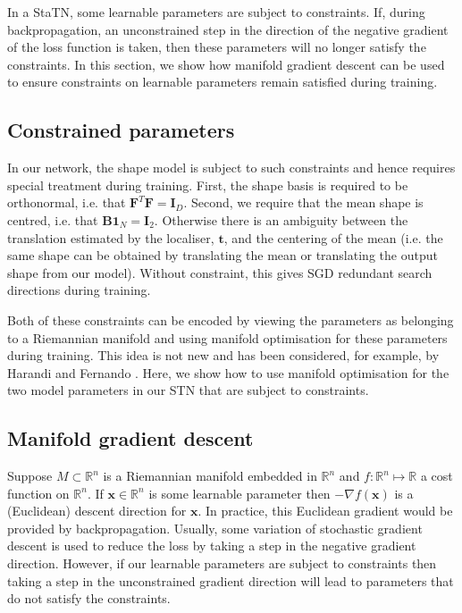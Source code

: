 \documentclass[runningheads]{llncs}
\newcommand{\R}{\mathbb{R}}
\begin{document}
In a StaTN, some learnable parameters are subject to constraints. If, during backpropagation, an unconstrained step in the direction of the negative gradient of the loss function is taken, then these parameters will no longer satisfy the constraints. In this section, we show how manifold gradient descent can be used to ensure constraints on learnable parameters remain satisfied during training. 

\subsection{Constrained parameters}

In our network, the shape model is subject to such constraints and hence requires special treatment during training. First, the shape basis is required to be orthonormal, i.e. that $\mathbf{F}^T\mathbf{F}=\mathbf{I}_D$. Second, we require that the mean shape is centred, i.e. that $\mathbf{B1}_N=\mathbf{I}_2$. Otherwise there is an ambiguity between the translation estimated by the localiser, $\mathbf{t}$, and the centering of the mean (i.e. the same shape can be obtained by translating the mean or translating the output shape from our model). Without constraint, this gives SGD redundant search directions during training.

Both of these constraints can be encoded by viewing the parameters as belonging to a Riemannian manifold and using manifold optimisation for these parameters during training. This idea is not new and has been considered, for example, by Harandi and Fernando \cite{harandi2016generalized}. Here, we show how to use manifold optimisation for the two model parameters in our STN that are subject to constraints.

\subsection{Manifold gradient descent}

Suppose $M\subset \R^n$ is a Riemannian manifold embedded in $\R^n$ and $f:\R^n\mapsto\R$ a cost function on $\R^n$. If $\mathbf{x}\in\R^n$ is some learnable parameter then $-\nabla f(\mathbf{x})$ is a (Euclidean) descent direction for $\mathbf{x}$. In practice, this Euclidean gradient would be provided by backpropagation. Usually, some variation of stochastic gradient descent is used to reduce the loss by taking a step in the negative gradient direction. However, if our learnable parameters are subject to constraints then taking a step in the unconstrained gradient direction will lead to parameters that do not satisfy the constraints. 
\end{document}
